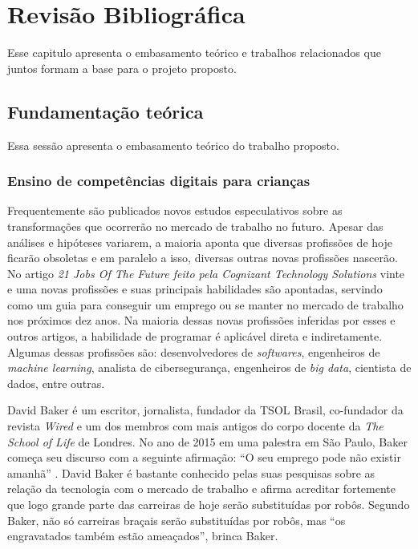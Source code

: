 \chapter{Revisão Bibliográfica} \label{cap:rev}
Esse capitulo apresenta o embasamento teórico e trabalhos relacionados que juntos formam a base para o projeto proposto.

\section{Fundamentação teórica}
Essa sessão apresenta o embasamento teórico do trabalho proposto.

\subsection{Ensino de competências digitais para crianças}

Frequentemente são publicados novos estudos especulativos sobre as transformações que ocorrerão no mercado de trabalho no futuro. Apesar das análises e hipóteses variarem, a maioria aponta que diversas profissões de hoje ficarão obsoletas e em paralelo a isso, diversas outras novas profissões nascerão. No artigo \textit{21 Jobs Of The Future feito pela Cognizant Technology Solutions} \cite{cognizant_2017} vinte e uma novas profissões e suas principais habilidades são apontadas, servindo como um guia para conseguir um emprego ou se manter no mercado de trabalho nos próximos dez anos. Na maioria dessas novas profissões inferidas por esses e outros artigos, a habilidade de programar é aplicável direta e indiretamente. Algumas dessas profissões são: desenvolvedores de \textit{softwares}, engenheiros de \textit{machine learning}, analista de cibersegurança, engenheiros de \textit{big data}, cientista de dados, entre outras.

David Baker é um escritor, jornalista, fundador da TSOL Brasil, co-fundador da revista \textit{Wired} e um dos membros com mais antigos do corpo docente da \textit{The School of Life} de Londres. No ano de 2015 em uma palestra em São Paulo, Baker começa seu discurso com a seguinte afirmação: “O seu emprego pode não existir amanhã” \cite{carvalho_2015}. David Baker é bastante conhecido pelas suas pesquisas sobre as relação da tecnologia com o mercado de trabalho e afirma acreditar fortemente que logo grande parte das carreiras de hoje serão substituídas por robôs. Segundo Baker, não só carreiras braçais serão substituídas por robôs, mas “os engravatados também estão ameaçados”, brinca Baker.

